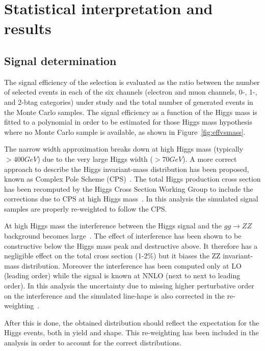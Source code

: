 

\chapter{Statistical interpretation and results}
\label{sec:results}

\section{Signal determination}
The signal efficiency of the selection is evaluated as the ratio between the number of selected events in each of the six channels (electron and muon channels, 0-, 1-, and 2-btag categories) under study and the total number of generated events in the Monte Carlo samples.  The signal efficiency as a function of the Higgs mass is fitted to a polynomial in order to be estimated for those Higgs mass hypothesis where no Monte Carlo sample is available, 
as shown in Figure~\ref{fig:effvsmass}.

The narrow width approximation breaks down at high Higgs mass (typically $>400 GeV$) due to the very large Higgs width ($>70 GeV$). 
A more correct approach to describe the Higgs invariant-mass distribution has been proposed, known as Complex Pole Scheme (CPS)~\cite{Goria:2011wa}.
The total Higgs production cross section has been recomputed by the Higgs Cross Section Working Group to include the corrections due to CPS at high Higgs mass~\cite{LHC-HCS}.  In this analysis the simulated signal samples are properly re-weighted to follow the CPS.

At high Higgs mass the interference between the Higgs signal and the $gg\rightarrow ZZ$ background becomes large~\cite{Passarino:2012ri}.  The effect of interference has been shown to be constructive below the Higgs mass peak and destructive above. It therefore has a negligible effect on the total cross section (1-2\%) but it biases the ZZ invariant-mass distribution. Moreover the interference has been computed only at LO (leading order) while the signal is known at NNLO (next to next to leading order). In this analysis the uncertainty due to missing higher perturbative order on the interference and the simulated line-hape is also corrected in the re-weighting~\cite{Passarino:2012ri}.

After this is done, the obtained distribution should reflect the expectation for the Higgs events, both in yield and shape. This re-weighting has been included in the analysis in order to account for the correct distributions.

